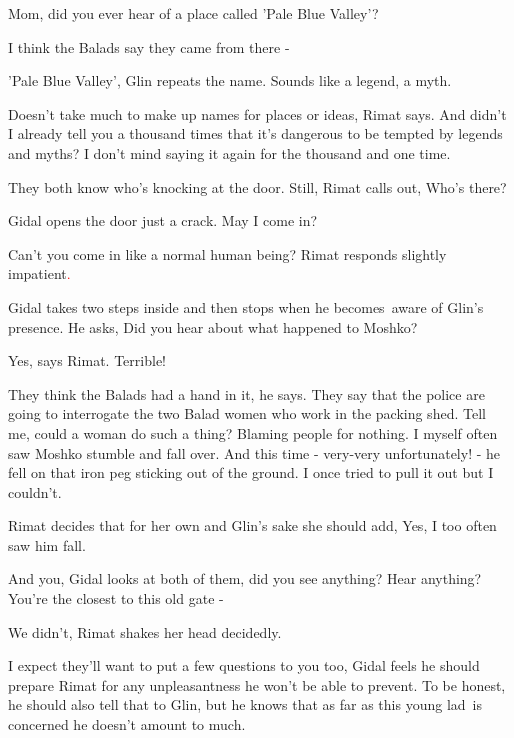 \documentclass[letterpaper]{article}
\begin{document}
{\textquotedbl}Mom, did you ever hear of a place called 'Pale Blue Valley'?{\textquotedbl}

{\textquotedbl}I think the Balads say they came from there -{\textquotedbl} 

{\textquotedbl}'Pale Blue Valley',{\textquotedbl} Glin repeats the name. {\textquotedbl}Sounds like a legend, a
myth.{\textquotedbl} 

{\textquotedbl}Doesn't take much to make up names for places or ideas,{\textquotedbl} Rimat says. {\textquotedbl}And
didn't I already tell you a thousand times that it's dangerous to be tempted by legends and myths? I don't mind saying
it again for the thousand and one time.{\textquotedbl} 

They both know who's knocking at the door. Still, Rimat calls out, {\textquotedbl}Who's there?{\textquotedbl}

Gidal opens the door just a crack. {\textquotedbl}May I come in?{\textquotedbl} 

{\textquotedbl}Can't you come in like a normal human being?{\textquotedbl} Rimat responds slightly
impatient\textcolor{red}{.\ \ }

Gidal takes two steps inside and then stops when he becomes\ aware of Glin's presence. He asks, {\textquotedbl}Did you
hear about what happened to Moshko?{\textquotedbl}

{\textquotedbl}Yes,{\textquotedbl} says Rimat. {\textquotedbl}Terrible!{\textquotedbl} 

{\textquotedbl}They think the Balads had a hand in it,{\textquotedbl} he says. {\textquotedbl}They say that the police
are going to interrogate the two Balad women who work in the packing shed. Tell me, could a woman do such a thing?
Blaming people for nothing. I myself often saw Moshko stumble and fall over. And this time - very{}-very unfortunately!
- he fell on that iron peg sticking out of the ground. I once tried to pull it out but I couldn't.{\textquotedbl} 

Rimat decides that for her own and Glin's sake she should add, {\textquotedbl}Yes, I too often saw him
fall.{\textquotedbl} 

{\textquotedbl}And you,{\textquotedbl} Gidal looks at both of them, {\textquotedbl}did you see anything? Hear anything?
You're the closest to this old gate -{\textquotedbl} 

{\textquotedbl}We didn't,{\textquotedbl} Rimat shakes her head decidedly. 

{\textquotedbl}I expect they'll want to put a few questions to you too,{\textquotedbl} Gidal feels he should prepare
Rimat for any unpleasantness he won't be able to prevent. To be honest, he should also tell that to Glin, but he knows
that as far as this young lad~is concerned he doesn't amount to much. 
\end{document}
